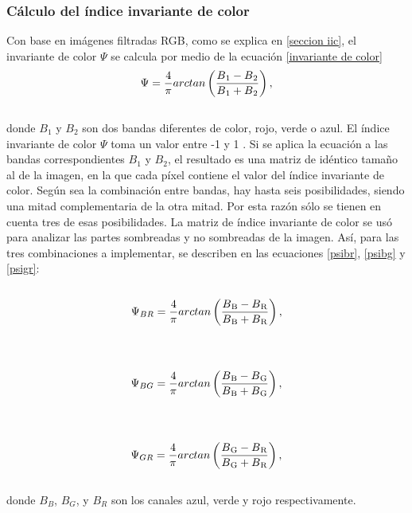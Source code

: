 \subsubsection{Cálculo del índice invariante de color}
Con base en imágenes filtradas RGB, como se explica en \ref{seccion iic}, el invariante de color $\Psi$ se calcula por medio de la ecuación \ref{invariante de color}
\\
\begin{equation}
	\Psi=\frac{4}{\pi} arctan\left(\frac{B\textsubscript{1}-B\textsubscript{2}}{B\textsubscript{1}+B\textsubscript{2}}\right),\label{invariante de color}
\end{equation}
\\
 donde $B_1$ y $B_2$ son dos bandas diferentes de color, rojo, verde o azul. El índice invariante de color $\Psi$ toma un valor entre -1 y 1 \cite{sirmacek_building_2008}. Si se aplica la ecuación a las bandas correspondientes $B_1$ y $B_2$, el resultado es una matriz de idéntico tamaño al de la imagen, en la que cada píxel contiene el valor del índice invariante de color. Según sea la combinación entre bandas, hay hasta seis posibilidades, siendo una mitad complementaria de la otra mitad. Por esta razón sólo se tienen en cuenta tres de esas posibilidades. La matriz de índice invariante de color se usó para analizar las partes sombreadas y no sombreadas de la imagen. Así, para las tres combinaciones a implementar, se describen en las ecuaciones \ref{psibr}, \ref{psibg} y \ref{psigr}:
 \\
 \\
\begin{equation}
	\Psi_{BR}=\frac{4}{\pi} arctan\left(\frac{B\textsubscript{B}-B\textsubscript{R}}{B\textsubscript{B}+B\textsubscript{R}}\right),\label{psibr}
\end{equation}
\\
\\
\begin{equation}
	\Psi_{BG}=\frac{4}{\pi} arctan\left(\frac{B\textsubscript{B}-B\textsubscript{G}}{B\textsubscript{B}+B\textsubscript{G}}\right),\label{psibg}
\end{equation}
\\
\\
\begin{equation}
	\Psi_{GR}=\frac{4}{\pi} arctan\left(\frac{B\textsubscript{G}-B\textsubscript{R}}{B\textsubscript{G}+B\textsubscript{R}}\right),\label{psigr}
\end{equation}
\\
donde $B_{B}$, $B_{G}$, y $B_{R}$ son los canales azul, verde y rojo respectivamente.
